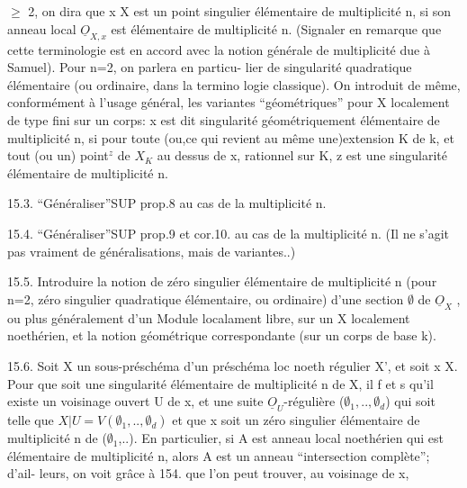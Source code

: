 
$\geqslant$ 2, on dira que x \hand{$\in$} X est un point singulier élémentaire de multiplicité
n, si son anneau local $\underline{O}_{X,x}$ est élémentaire de multiplicité n. (Signaler
en remarque que cette  terminologie est en accord avec la notion
générale de multiplicité due à Samuel). Pour n=2, on parlera en particu-%
lier de singularité quadratique élémentaire (ou ordinaire, dans la termino
logie classique). On introduit de même, conformément à l'usage général,
les variantes ``géométriques'' pour X localement de type fini sur un corps:
x  est dit singularité géométriquement élémentaire de multiplicité n, si
pour toute (ou,ce qui revient au même\unsure{,} une)extension K de k, et tout
(ou un) point$^{z}$ de $X_{K}$ au dessus de x, rationnel sur K, z est une
singularité élémentaire de multiplicité n.

15.3. ``Généraliser''SUP prop.8 au cas de la multiplicité n.

15.4. ``Généraliser''SUP prop.9 et cor.10. au cas de la multiplicité n.
(Il ne s'agit pas vraiment de généralisations, mais de variantes..)

15.5. Introduire la notion de zéro singulier élémentaire de multiplicité
n (pour n=2, zéro singulier quadratique élémentaire, ou ordinaire) d'une
section $\emptyset$ de $\underline{O}_{X}$ , ou plus généralement d'un Module localament libre, sur
un X localement noethérien, et la notion géométrique correspondante
(sur un corps de base k).

15.6. Soit X un sous-préschéma d'un préschéma loc noeth régulier X', et
soit x \hand{$\in$}X. Pour que  soit une singularité élémentaire de multiplicité
n de X, il f et s qu'il existe un voisinage ouvert U de x, et une
suite $\underline{O}_{U}$-régulière ($\emptyset_{1},..,\emptyset_{d}$) qui soit telle que $X|U = V(\emptyset_{1},..,\emptyset_{d})$ et
que x soit un zéro singulier élémentaire de multiplicité n de ($\emptyset_{1}$,..).
En particulier, si A est anneau local noethérien qui est élémentaire
 de multiplicité n, alors A est un anneau ``intersection complète''; d'ail-%
leurs, on voit grâce à 154. que l'on peut trouver, au voisinage de x,


